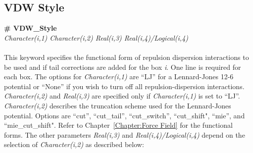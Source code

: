 \subsection{VDW Style}\label{sec:VDW_Style}
{\bf \# VDW\_Style} \\
{\it Character(i,1)  Character(i,2) Real(i,3) Real(i,4)/Logical(i,4)} \\ \\
%
This keyword specifies the functional form of repulsion dispersion
interactions to be used and if tail corrections are added for the box
\emph{i}. One line is required for each box. 
The options for {\it Character(i,1)} are ``LJ'' for a Lennard-Jones
12-6 potential or ``None'' if you wish to turn off all
repulsion-dispersion interactions. {\it Character(i,2)} and {\it Real(i,3)}
 are specified only if {\it Character(i,1)} is set to ``LJ''. {\it Character(i,2)}
 describes the truncation scheme used for the Lennard-Jones potential.
Options are ``cut'', ``cut\_tail'', ``cut\_switch'',
``cut\_shift", ``mie'', and ``mie\_cut\_shift". Refer to Chapter~\ref{Chapter:Force Field} for the
functional forms.
 The other parameters
\emph{Real(i,3)} and \emph{Real(i,4)/Logical(i,4)} depend on the
selection of \emph{Character(i,2)} as described below:
%
